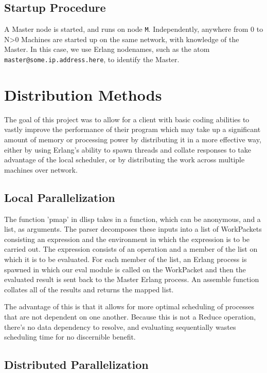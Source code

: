 \documentclass[letterpaper,twocolumn,10pt]{article}
\begin{document}
\subsection{Startup Procedure}

A Master node is started, and runs on node \verb|M|. Independently, anywhere
from 0 to N>0 Machines are started up on the same network, with knowledge of
the Master. In this case, we use Erlang nodenames, such as the atom
\verb|master@some.ip.address.here|, to identify the Master.

\section{Distribution Methods}

The goal of this project was to allow for a client with basic coding abilities
to vastly improve the performance of their program which may take up a significant
amount of memory or processing power by distributing it in a more effective way,
either  by using Erlang's ability to spawn threads and collate responses to take
advantage of the local scheduler, or by distributing the work across multiple machines
over network.

\subsection{Local Parallelization}

The function 'pmap' in dlisp takes in a function, which can be anonymous, and 
a list, as arguments. The parser decomposes these inputs into a list of WorkPackets
consisting an expression and the environment in which the expression is to be carried out.
The expression consists of an operation and a member of the list on which it is to be
evaluated. For each member of the list, an Erlang process is spawned in which our eval
module is called on the WorkPacket and then the evaluated result is sent back to the Master
Erlang process. An assemble function collates all of the results and returns the mapped list.

The advantage of this is that it allows for more optimal scheduling of processes that are not
dependent on one another. Because this is not a Reduce operation, there's no data dependency
to resolve, and evaluating sequentially wastes scheduling time for no discernible benefit.

\subsection{Distributed Parallelization}
\end{document}
